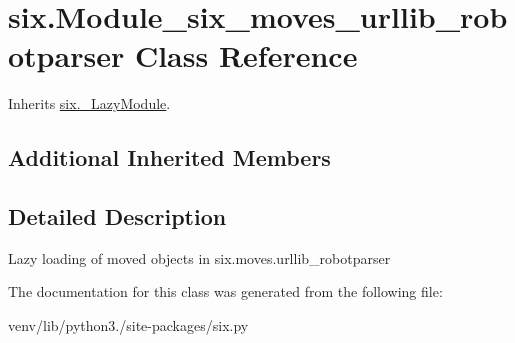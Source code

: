 \hypertarget{classsix_1_1_module__six__moves__urllib__robotparser}{}\section{six.\+Module\+\_\+six\+\_\+moves\+\_\+urllib\+\_\+robotparser Class Reference}
\label{classsix_1_1_module__six__moves__urllib__robotparser}


Inherits \hyperlink{classsix_1_1___lazy_module}{six.\+\_\+\+Lazy\+Module}.

\subsection*{Additional Inherited Members}


\subsection{Detailed Description}
\begin{DoxyVerb}Lazy loading of moved objects in six.moves.urllib_robotparser\end{DoxyVerb}
 

The documentation for this class was generated from the following file\+:\begin{DoxyCompactItemize}
\item 
venv/lib/python3./site-\/packages/six.\+py\end{DoxyCompactItemize}
